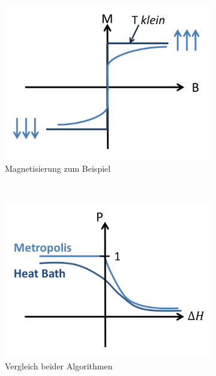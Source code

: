 \documentclass[12pt]{article}
\begin{document}
\begin{figure}[h] 
		\begin{subfigure}[h]{0.5 \textwidth}
		\centering
		\includegraphics[width=\textwidth]{Folie27.png}
		\caption{Magnetisierung zum Beispiel} 
		\label{fig:Magnetisierung}
		\centering
	\end{subfigure}
	~
\begin{subfigure}[h]{0.5\textwidth}
		\centering
		\includegraphics[width=\textwidth]{Folie28.png}
		\caption{Vergleich beider Algorithmen}
		\label{fig:MA_HB}
		\centering
	\end{subfigure}
	\caption{ }
\end{figure}	
\end{document}
